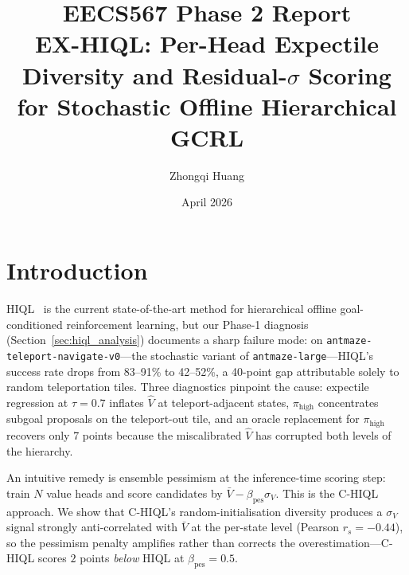 \documentclass[11pt]{article}
\title{EECS567 Phase 2 Report\\
       \large EX-HIQL: Per-Head Expectile Diversity and Residual-$\sigma$ Scoring
       for Stochastic Offline Hierarchical GCRL}
\author{Zhongqi Huang}
\date{April 2026}
\begin{document}
\maketitle

\section{Introduction}
\label{sec:intro}

HIQL~\citep{park2023hiql} is the current state-of-the-art method for
hierarchical offline goal-conditioned reinforcement learning, but our
Phase-1 diagnosis (Section~\ref{sec:hiql_analysis}) documents a sharp
failure mode: on \texttt{antmaze-teleport-navigate-v0}---the stochastic
variant of \texttt{antmaze-large}---HIQL's success rate drops from 83--91\%
to 42--52\%, a 40-point gap attributable solely to random teleportation
tiles.
Three diagnostics pinpoint the cause: expectile regression at $\tau = 0.7$
inflates $\hat V$ at teleport-adjacent states, $\pi_\text{high}$
concentrates subgoal proposals on the teleport-out tile, and an oracle
replacement for $\pi_\text{high}$ recovers only 7 points because the
miscalibrated $\hat V$ has corrupted both levels of the hierarchy.

An intuitive remedy is ensemble pessimism at the inference-time scoring
step: train $N$ value heads and score candidates by
$\bar V - \beta_\text{pes}\sigma_V$.
This is the C-HIQL approach.
We show that C-HIQL's random-initialisation diversity produces a
$\sigma_V$ signal strongly anti-correlated with $\bar V$ at the per-state
level (Pearson $r_s = -0.44$), so the pessimism penalty amplifies rather
than corrects the overestimation---C-HIQL scores $2$ points \emph{below}
HIQL at $\beta_\text{pes} = 0.5$.
\end{document}
